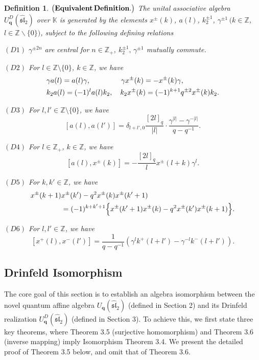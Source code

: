 \documentclass[12pt]{amsart}
\newtheorem{defi}[theorem]{Definition}
\numberwithin{equation}{section}
\numberwithin{equation}{section}
\begin{document}
\begin{defi}\(\bigl({\bf Equivalent\,Definition.}\bigr)\) The unital associative algebra \(U^{D}_{\textbf{q}}(\widehat{\mathfrak{sl}}_2)\)  over \(\mathbb{K}\)  is generated by the elements \(x^{\pm}(k)\), \(a(l)\), \(k_2^{\pm 1}\), \(\gamma^{\pm 1}\)\,\((k \in \mathbb{Z}\), \(l\in \mathbb{Z}\backslash\{0\})\),  subject to the following defining relations

\((D1)\) 
\(\gamma^{\pm 2n}\) are central for \(n \in \mathbb{Z}_{+}\), \(k^{\pm1}_2,\,\gamma^{\pm1}\) mutually commute.

\((D2)\) 
For \(l \in \mathbb{Z}\setminus\{0\}\), \(k \in \mathbb{Z}\),  we have
\begin{align*}  
&\gamma a(l) = a(l)\gamma, \hspace{1.5cm} \gamma x^{\pm}(k)=-x^{\pm}(k)\gamma,\\ &k_2a(l) = (-1)^{l}a(l)k_2,\quad k_2 x^{\pm}(k)  = (-1)^{k+1} q^{\pm 2} x^{\pm}(k) k_2. \end{align*} 


\((D3)\)
For \(l, l' \in \mathbb{Z}\setminus\{0\}\), we have
\[
\left[a(l),a(l')\right]=\delta_{l+l',0}\frac{[2l]_q}{|l|}\cdot\frac{\gamma^{|l|}-\gamma^{-|l|}}{q-q^{-1}}.
\]  

\((D4)\) 
For \(l \in \mathbb{Z}_{+}\), \(k \in \mathbb{Z}\), we have
\[
\left[a(l),x^{\pm}(k)\right]=-\dfrac{[2l]_q}{l}x^{\pm}(l+k)\gamma^l.
\]

\((D5)\) 
For \(k, k' \in \mathbb{Z}\), we have
\begin{align*} 
x^{\pm}(k+1)&x^{\pm}(k') - q^2 x^{\pm}(k)x^{\pm}(k' + 1) \\ 
&= (-1)^{k + k' + 1} \Bigl\{ x^{\pm}(k' + 1)x^{\pm}(k)  - q^2 x^{\pm}(k')x^{\pm}(k + 1) \Bigr\}. 
\end{align*}

\((D6)\)
For \(l, l' \in \mathbb{Z}\), we have 
\[
\left[x^+(l),x^-(l')\right]=\frac{1}{q-q^{-1}}\left(\gamma^l k^+(l+l')-\gamma^{-l}k^-(l+l')\right).
\]
\end{defi}


\subsection{Drinfeld Isomorphism} 
The core goal of this section is to establish an algebra isomorphism between the novel quantum affine algebra \(U_{\textbf{q}}(\widehat{\mathfrak{sl}}_{2})\) (defined in Section 2) and its Drinfeld realization \(U^{D}_{\textbf{q}}(\widehat{\mathfrak{sl}}_{2})\) (defined in Section 3). To achieve this, we first state three key theorems, where Theorem 3.5 (surjective homomorphism) and Theorem 3.6 (inverse mapping)  imply  Isomorphism Theorem 3.4. We present the detailed proof of Theorem 3.5 below, and omit that of Theorem 3.6. 
\end{document}
